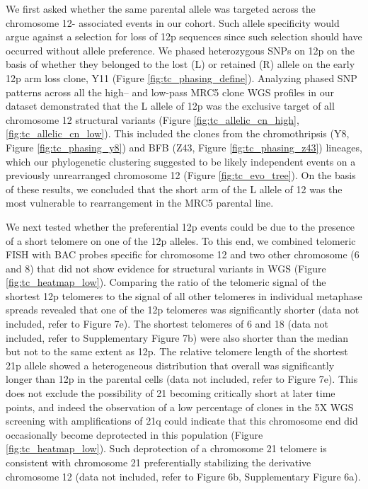 \documentclass[phd,tocprelim]{cornell}
\begin{document}
We first asked whether the same parental allele was targeted across the chromosome 12- associated events in our cohort. Such allele specificity would argue against a selection for loss of 12p sequences since such selection should have occurred without allele preference. We phased heterozygous SNPs on 12p on the basis of whether they belonged to the lost (L) or retained (R) allele on the early 12p arm loss clone, Y11 (Figure \ref{fig:tc_phasing_define}). Analyzing phased SNP patterns across all the high– and low-pass MRC5 clone WGS profiles in our dataset demonstrated that the L allele of 12p was the exclusive target of all chromosome 12 structural variants (Figure \ref{fig:tc_allelic_cn_high}, \ref{fig:tc_allelic_cn_low}). This included the clones from the chromothripsis (Y8, Figure \ref{fig:tc_phasing_y8}) and BFB (Z43, Figure \ref{fig:tc_phasing_z43}) lineages, which our phylogenetic clustering suggested to be likely independent events on a previously unrearranged chromosome 12 (Figure \ref{fig:tc_evo_tree}). On the basis of these results, we concluded that the short arm of the L allele of 12 was the most vulnerable to rearrangement in the MRC5 parental line.

We next tested whether the preferential 12p events could be due to the presence of a short telomere on one of the 12p alleles. To this end, we combined telomeric FISH with BAC probes specific for chromosome 12 and two other chromosome (6 and 8) that did not show evidence for structural variants in WGS (Figure \ref{fig:tc_heatmap_low}). Comparing the ratio of the telomeric signal of the shortest 12p telomeres to the signal of all other telomeres in individual metaphase spreads revealed that one of the 12p telomeres was significantly shorter (data not included, refer to \cite{Dewhurst2021-jk} Figure 7e). The shortest telomeres of 6 and 18 (data not included, refer to \cite{Dewhurst2021-jk} Supplementary Figure 7b) were also shorter than the median but not to the same extent as 12p. The relative telomere length of the shortest 21p allele showed a heterogeneous distribution that overall was significantly longer than 12p in the parental cells (data not included, refer to \cite{Dewhurst2021-jk} Figure 7e). This does not exclude the possibility of 21 becoming critically short at later time points, and indeed the observation of a low percentage of clones in the 5X WGS screening with amplifications of 21q could indicate that this chromosome end did occasionally become deprotected in this population (Figure \ref{fig:tc_heatmap_low}). Such deprotection of a chromosome 21 telomere is consistent with chromosome 21 preferentially stabilizing the derivative chromosome 12 (data not included, refer to \cite{Dewhurst2021-jk} Figure 6b, Supplementary Figure 6a).
\end{document}
